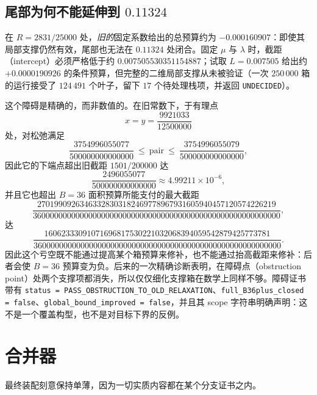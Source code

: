\subsection{尾部为何不能延伸到 $0.11324$}

在 $R=2831/25000$ 处，\emph{旧的}固定系数给出的总预算约为 $-0.000160907$：即使其局部支撑仍然有效，尾部也无法在 $0.11324$ 处闭合。固定 $\mu$ 与 $\lambda$ 时，截距（intercept）必须严格低于约 $0.007505530351154887$；试取 $L=0.007505$ 给出约 $+0.0000190926$ 的条件预算，但完整的二维局部支撑从未被验证（一次 $250\,000$ 箱的运行接受了 $124\,491$ 个叶子，留下 $17$ 个待处理栈项，并返回 \texttt{UNDECIDED}）。

这个障碍是精确的，而非数值的。在旧常数下，于有理点
\[
x=y=\frac{9921033}{12500000}
\]
处，对松弛满足
\[
\frac{3754996055077}{500000000000000}\ \le\ \text{pair}\ \le\ \frac{3754996055079}{500000000000000},
\]
因此它的下端点超出旧截距 $1501/200000$ 达
\[
\frac{2496055077}{500000000000000}\approx4.99211\times10^{-6},
\]
并且它也超出 $B=36$ 面积预算所能支付的最大截距
\[
\frac{27019909263463328303182469778967931605940457120574226219}
{3600000000000000000000000000000000000000000000000000000000},
\]
达
\[
\frac{16062333091071696817530221032068394059542879425773781}
{3600000000000000000000000000000000000000000000000000000000}.
\]
因此这个亏空既不能通过提高某个箱预算来修补，也不能通过抬高截距来修补：后者会使 $B=36$ 预算变为负。后来的一次精确诊断表明，在障碍点（obstruction point）处两个支撑项都消失，所以仅仅细化支撑箱在数学上同样不够。障碍证书带有 \texttt{status = PASS\_\allowbreak{}OBSTRUCTION\_\allowbreak{}TO\_\allowbreak{}OLD\_\allowbreak{}RELAXATION}、\texttt{full\_\allowbreak{}B36plus\_\allowbreak{}closed = false}、\texttt{global\_\allowbreak{}bound\_\allowbreak{}improved = false}，并且其 scope 字符串明确声明：这不是一个覆盖构型，也不是对目标下界的反例。

\section{合并器}

最终装配刻意保持单薄，因为一切实质内容都在某个分支证书之内。

